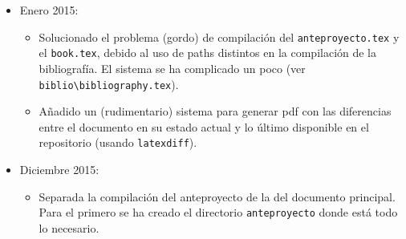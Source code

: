 \begin{itemize}
\item Enero 2015:
  \begin{itemize}
  \item Solucionado el problema (gordo) de compilación del
    \texttt{anteproyecto.tex} y el \texttt{book.tex}, debido al uso de
    paths distintos en la compilación de la bibliografía. El sistema se ha
    complicado un poco (ver
    \texttt{biblio\textbackslash{}bibliography.tex}).
  \item Añadido un (rudimentario) sistema para generar pdf con las
    diferencias entre el documento en su estado actual y lo último
    disponible en el repositorio (usando \texttt{latexdiff}).
  \end{itemize}
\item Diciembre 2015:
  \begin{itemize}
  \item Separada la compilación del anteproyecto de la del documento
    principal. Para el primero se ha creado el directorio
    \texttt{anteproyecto} donde está todo lo necesario.
  \end{itemize}
\end{itemize}



